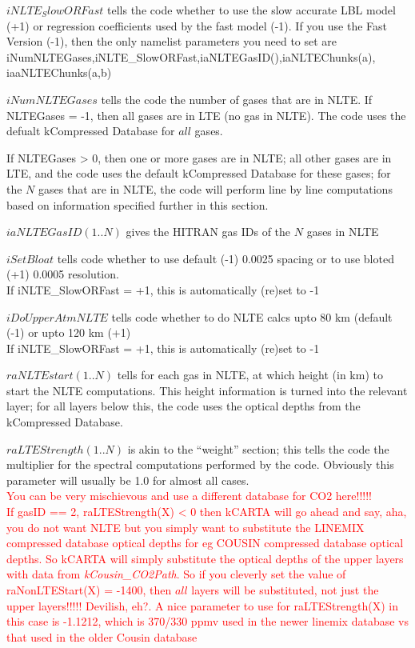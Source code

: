 \documentclass[12pt]{article}
\newcommand{\kc}{\textsf{kCARTA}\xspace}
\begin{document}
{{\noindent $iNLTE_SlowORFast$ tells the code whether to use the slow accurate
LBL model (+1) or regression coefficients used by the fast model (-1). If you
use the Fast Version (-1), then the only namelist parameters you need to 
set are iNumNLTEGases,iNLTE\_SlowORFast,iaNLTEGasID(),iaNLTEChunks(a),
                  iaaNLTEChunks(a,b)

\noindent $iNumNLTEGases$ tells the code the number of gases that are in NLTE.
If NLTEGases = -1, then all gases are in LTE (no gas in NLTE). The code uses 
the defualt kCompressed Database for $all$ gases.

If NLTEGases > 0, then one or more gases are in NLTE; all other gases are in 
LTE, and the code uses the default kCompressed Database for these gases; for 
the $N$ gases that are in NLTE, the code will perform line by line computations
based on information specified further in this section.

\noindent $iaNLTEGasID(1..N)$ gives the HITRAN gas IDs of the $N$ gases in NLTE

\noindent $iSetBloat$ tells code whether to use default (-1) 0.0025 \wn 
spacing or to use bloted (+1) 0.0005 \wn resolution.\\
If iNLTE\_SlowORFast = +1, this is automatically (re)set to -1

\noindent $iDoUpperAtmNLTE$ tells code whether to do NLTE calcs upto 80 km 
(default (-1) or upto 120 km (+1)\\
If iNLTE\_SlowORFast = +1, this is automatically (re)set to -1

\noindent $raNLTEstart(1..N)$ tells for each gas in NLTE, at which height 
(in km) to start the NLTE computations. This height information is turned into
the relevant layer; for all layers below this, the code 
uses the optical depths from the kCompressed Database.

\noindent $raLTEStrength(1..N)$ is akin to the ``weight'' section; this tells 
the code the multiplier for the spectral computations performed by the code.
Obviously this parameter will usually be 1.0 for almost all cases.\\
\textcolor{red}
{You can be very mischievous and use a different database for CO2 here!!!!! \\
If gasID == 2, raLTEStrength(X) < 0 then kCARTA will go ahead and say, aha, 
you do not want NLTE but you simply want to substitute the LINEMIX compressed
database optical depths for eg COUSIN compressed database optical depths. So
\kc will simply substitute the optical depths of the upper layers with 
data from \emph{kCousin\_CO2Path}. So if you cleverly set the value of 
raNonLTEStart(X) = -1400, then $all$ layers will be substituted, not just the 
upper layers!!!!! Devilish, eh?. A nice parameter to use for raLTEStrength(X)
in this case is -1.1212, which is 370/330 ppmv used in the newer linemix
database vs that used in the older Cousin database}

}}
\end{document}
